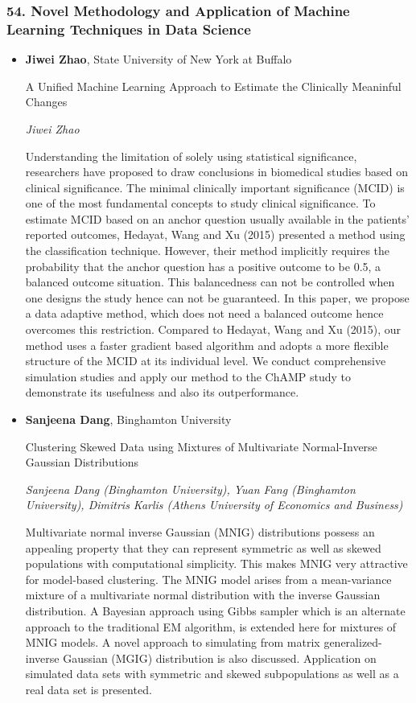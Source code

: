 \subsubsection*{54. Novel Methodology and Application of Machine Learning Techniques in Data Science}

\begin{itemize}
\item \textbf{Jiwei Zhao}, State University of New York at Buffalo

A Unified Machine Learning Approach to Estimate the Clinically Meaninful Changes

\emph{\footnotesize Jiwei Zhao}

Understanding the limitation of solely using statistical significance, researchers have proposed to draw conclusions in biomedical studies based on clinical significance. The minimal clinically important significance (MCID) is one of the most fundamental concepts to study clinical significance. To estimate MCID based on an anchor question usually available in the patients' reported outcomes, Hedayat, Wang and Xu (2015) presented a method using the classification technique. However, their method implicitly requires the probability that the anchor question has a positive outcome to be 0.5, a balanced outcome situation. This balancedness can not be controlled when one designs the study hence can not be guaranteed. In this paper, we propose a data adaptive method,  which does not need a balanced outcome hence overcomes this restriction. Compared to Hedayat, Wang and Xu (2015), our method uses a faster gradient based algorithm and adopts a more flexible structure of the MCID at its individual level. We conduct comprehensive simulation studies and apply our method to the ChAMP study to demonstrate its usefulness and also its outperformance.

\item \textbf{Sanjeena Dang}, Binghamton University

Clustering Skewed Data using Mixtures of Multivariate Normal-Inverse Gaussian Distributions

\emph{\footnotesize Sanjeena Dang (Binghamton University), Yuan Fang (Binghamton University), Dimitris Karlis (Athens University of Economics and Business)}

Multivariate normal inverse Gaussian (MNIG) distributions possess an appealing property that they can represent symmetric as well as skewed populations with computational simplicity. This makes MNIG very attractive for model-based clustering. The MNIG model arises from a mean-variance mixture of a multivariate normal distribution with the inverse Gaussian distribution. A Bayesian approach using Gibbs sampler which is an alternate approach to the traditional EM algorithm, is extended here for mixtures of MNIG models. A novel approach to simulating from matrix generalized-inverse Gaussian (MGIG) distribution is also discussed. Application on simulated data sets with symmetric and skewed subpopulations as well as a real data set is presented.


\end{itemize}
